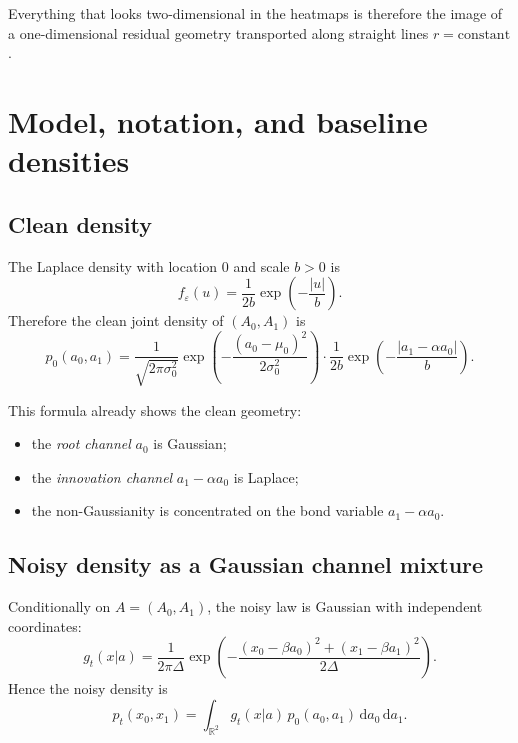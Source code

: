 \documentclass[11pt]{article}
\newcommand{\R}{\mathbb{R}}
\newcommand{\dd}{\mathrm{d}}
\newcommand{\1}{\mathbf{1}}
\newcommand{\pt}{p_t}
\theoremstyle{definition}
\begin{document}
Everything that looks two-dimensional in the heatmaps is therefore the image of a one-dimensional residual geometry transported along straight lines \(r=\mathrm{constant}\).

\section{Model, notation, and baseline densities}

\subsection{Clean density}

The Laplace density with location \(0\) and scale \(b>0\) is
\begin{equation}
\label{eq:laplace-density}
f_{\varepsilon}(u)=\frac{1}{2b}\exp\!\left(-\frac{|u|}{b}\right).
\end{equation}
Therefore the clean joint density of \((A_0,A_1)\) is
\begin{equation}
\label{eq:clean-joint-density}
p_0(a_0,a_1)
=
\frac{1}{\sqrt{2\pi\sigma_0^2}}
\exp\!\left(-\frac{(a_0-\mu_0)^2}{2\sigma_0^2}\right)
\cdot
\frac{1}{2b}\exp\!\left(-\frac{|a_1-\alpha a_0|}{b}\right).
\end{equation}

This formula already shows the clean geometry:
\begin{itemize}[leftmargin=2em]
    \item the \emph{root channel} \(a_0\) is Gaussian;
    \item the \emph{innovation channel} \(a_1-\alpha a_0\) is Laplace;
    \item the non-Gaussianity is concentrated on the bond variable \(a_1-\alpha a_0\).
\end{itemize}

\subsection{Noisy density as a Gaussian channel mixture}

Conditionally on \(A=(A_0,A_1)\), the noisy law is Gaussian with independent coordinates:
\begin{equation}
\label{eq:ou-kernel}
g_t(x|a)
=
\frac{1}{2\pi\Delta}
\exp\!\left(-\frac{(x_0-\beta a_0)^2+(x_1-\beta a_1)^2}{2\Delta}\right).
\end{equation}
Hence the noisy density is
\begin{equation}
\label{eq:noisy-integral}
\pt(x_0,x_1)=\int_{\R^2} g_t(x|a)\, p_0(a_0,a_1)\, \dd a_0\,\dd a_1.
\end{equation}
\end{document}
